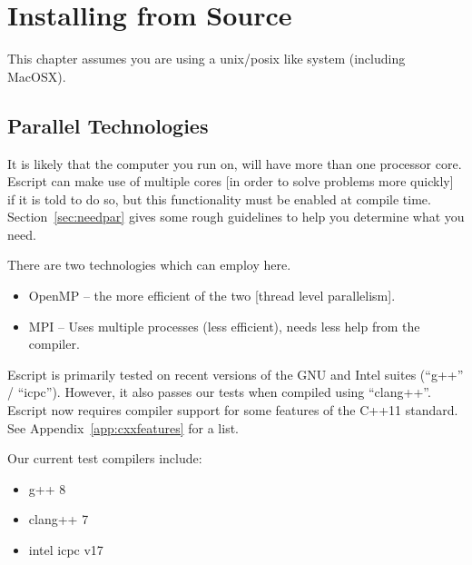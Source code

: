 %
%
%


\chapter{Installing from Source}\label{chap:source}

This chapter assumes you are using a unix/posix like system (including MacOSX).

\section{Parallel Technologies}\label{sec:par}
It is likely that the computer you run \escript on, will have more than one processor core.
Escript can make use of multiple cores [in order to solve problems more quickly] if it is told to do so,
but this functionality must be enabled at compile time.
Section~\ref{sec:needpar} gives some rough guidelines to help you determine what you need.

There are two technologies which \escript can employ here.
\begin{itemize}
 \item OpenMP -- the more efficient of the two [thread level parallelism].
 \item MPI -- Uses multiple processes (less efficient), needs less help from the compiler.
\end{itemize}

Escript is primarily tested on recent versions of the GNU and Intel suites (``g++'' / ``icpc'').
However, it also passes our tests when compiled using ``clang++''.
Escript now requires compiler support for some features of the C++11 standard.
See Appendix~\ref{app:cxxfeatures} for a list.


Our current test compilers include:
\begin{itemize}
 \item g++ 8
 \item clang++ 7
 \item intel icpc v17
\end{itemize}

